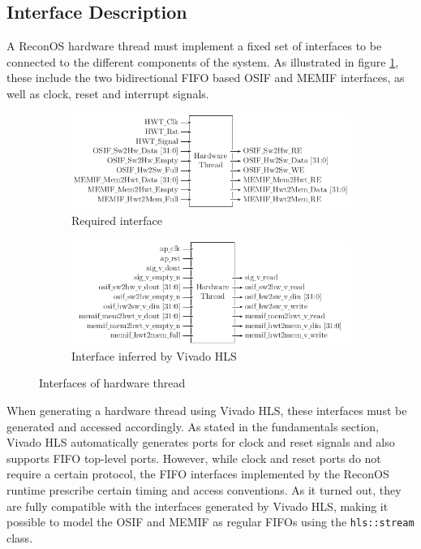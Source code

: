 \subsection{Interface Description}
A ReconOS hardware thread must implement a fixed set of interfaces to be
connected to the different components of the system. As illustrated in figure
\ref{fig:hwt_if_o}, these include the two bidirectional \ac{FIFO} based
\ac{OSIF} and \ac{MEMIF} interfaces, as well as clock, reset and interrupt
signals.
\begin{figure}
	\centering
	\begin{subfigure}{10.2cm}
		\centering
		\includegraphics{../figures/hwt_if_o}
		\caption{Required interface}
		\label{fig:hwt_if_o}
	\end{subfigure}
	\par\bigskip
	\begin{subfigure}{10.2cm}
		\centering
		\includegraphics{../figures/hwt_if_h}
		\caption{Interface inferred by Vivado HLS}
		\label{fig:hwt_if_h}
	\end{subfigure}
	\caption{Interfaces of hardware thread}
	\label{fig:hwt_if}
\end{figure}
When generating a hardware thread using Vivado HLS, these interfaces must be
generated and accessed accordingly. As stated in the fundamentals section,
Vivado HLS automatically generates ports for clock and reset signals and also
supports \ac{FIFO} top-level ports. However, while clock and reset ports do
not require a certain protocol, the \ac{FIFO} interfaces implemented by the
ReconOS runtime prescribe certain timing and access conventions. As it turned
out, they are fully compatible with the interfaces generated by Vivado HLS,
making it possible to model the \ac{OSIF} and \ac{MEMIF} as regular \acp{FIFO}
using the \lstinline{hls::stream} class.

